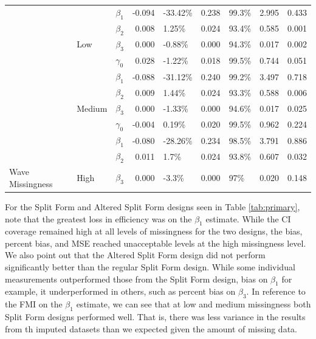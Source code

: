 \documentclass{svjour3}\usepackage[]{graphicx}\usepackage[]{color}
\newenvironment{knitrout}{}{} %
\begin{document}
\begin{knitrout}
\begin{table}[!h]
{\begin{tabular}[t]{l|l|l|r|l|r|l|r|r}
 &  & $\beta_1$ & -0.094 & -33.42\% & 0.238 & 99.3\% & 2.995 & 0.433\\

 &  & $\beta_2$ & 0.008 & 1.25\% & 0.024 & 93.4\% & 0.585 & 0.001\\

 & \multirow{-4}{*}{\raggedright\arraybackslash Low} & $\beta_3$ & 0.000 & -0.88\% & 0.000 & 94.3\% & 0.017 & 0.002\\

 &  & $\gamma_0$ & 0.028 & -1.22\% & 0.018 & 99.5\% & 0.744 & 0.051\\

 &  & $\beta_1$ & -0.088 & -31.12\% & 0.240 & 99.2\% & 3.497 & 0.718\\

 &  & $\beta_2$ & 0.009 & 1.44\% & 0.024 & 93.3\% & 0.588 & 0.006\\

 & \multirow{-4}{*}{\raggedright\arraybackslash Medium} & $\beta_3$ & 0.000 & -1.33\% & 0.000 & 94.6\% & 0.017 & 0.025\\

 &  & $\gamma_0$ & -0.004 & 0.19\% & 0.020 & 99.5\% & 0.962 & 0.224\\

 &  & $\beta_1$ & -0.080 & -28.26\% & 0.234 & 98.5\% & 3.791 & 0.886\\

 &  & $\beta_2$ & 0.011 & 1.7\% & 0.024 & 93.8\% & 0.607 & 0.032\\

\multirow{-12}{*}{\raggedright\arraybackslash Wave Missingness} & \multirow{-4}{*}{\raggedright\arraybackslash High} & $\beta_3$ & 0.000 & -3.3\% & 0.000 & 97\% & 0.020 & 0.148\\
\hline
\end{tabular}}
\end{table}


\end{knitrout}

For the Split Form and Altered Split Form designs seen in Table \ref{tab:primary}, note that the greatest loss in efficiency was on the $\beta_1$ estimate. While the CI coverage remained high at all levels of missingness for the two designs, the bias, percent bias, and MSE reached unacceptable levels at the high missingness level. We also point out that the Altered Split Form design did not perform significantly better than the regular Split Form design. While some individual measurements outperformed those from the Split Form design, bias on $\beta_1$ for example, it underperformed in others, such as percent bias on $\beta_3$. In reference to the FMI on the $\beta_1$ estimate, we can see that at low and medium missingness both Split Form designs performed well. That is, there was less variance in the results from th imputed datasets than we expected given the amount of missing data.\par
\end{document}
